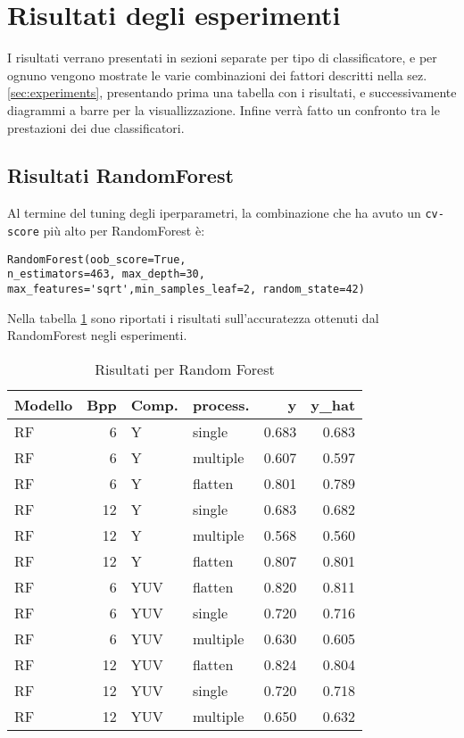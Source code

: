 \section{Risultati degli esperimenti}\label{sec:results}
I risultati verrano presentati in sezioni separate per tipo di classificatore, e per ognuno vengono mostrate le varie combinazioni dei fattori descritti nella sez. \ref{sec:experiments}, presentando prima una tabella con i risultati, e successivamente diagrammi a barre per la visuallizzazione.
Infine verrà fatto un confronto tra le prestazioni dei due classificatori.
\subsection{Risultati RandomForest}
Al termine del tuning degli iperparametri, la combinazione che ha avuto un \texttt{cv-score} più alto per RandomForest è:
\begin{lstlisting}[style=pythonElegant, caption={Miglior combinazione di parametri per RandomForestClassifier}]
RandomForest(oob_score=True,
n_estimators=463, max_depth=30, max_features='sqrt',min_samples_leaf=2, random_state=42)
\end{lstlisting}
Nella tabella \ref{tab:RF-results-table} sono riportati i risultati sull'accuratezza ottenuti dal RandomForest negli esperimenti.
\begin{table}
\centering
\caption{Risultati per Random Forest}\label{tab:RF-results-table}
\begin{tabular}{lrllrr}
\toprule
Modello &  Bpp &  Comp. &     process. &     y &  y\_hat \\
\midrule
RF &  6 &       Y &   single & 0.683 &  0.683 \\
RF &  6 &       Y & multiple & 0.607 &  0.597 \\
RF &  6 &       Y & flatten & 0.801 & 0.789  \\
RF & 12 &       Y &   single & 0.683 &  0.682 \\
RF & 12 &       Y & multiple & 0.568 &  0.560 \\
RF &  12 &       Y & flatten &  0.807&  0.801\\

\midrule
RF &  6 &     YUV &  flatten & 0.820 &  0.811 \\
RF &  6 &     YUV &   single & 0.720 &  0.716 \\
RF &  6 &     YUV & multiple & 0.630 &  0.605 \\
RF & 12 &     YUV &  flatten & 0.824 &  0.804 \\
RF & 12 &     YUV &   single & 0.720 &  0.718 \\
RF & 12 &     YUV & multiple & 0.650 &  0.632 \\
\bottomrule
\end{tabular}
\end{table}
